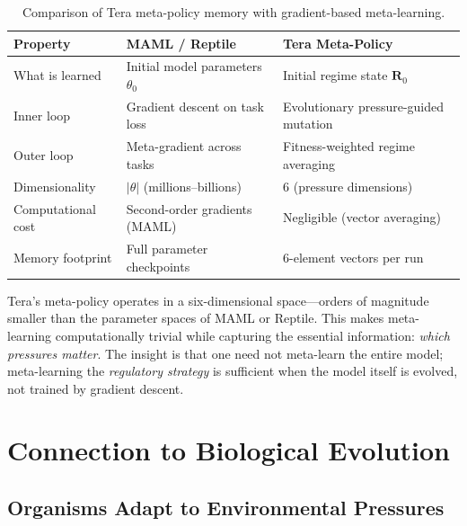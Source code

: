 \begin{table}[H]
\centering
\caption{Comparison of Tera meta-policy memory with gradient-based meta-learning.}
\label{tab:meta-comparison}
\begin{tabularx}{\textwidth}{L{3cm} Y Y}
\toprule
\textbf{Property} & \textbf{MAML / Reptile} & \textbf{Tera Meta-Policy} \\
\midrule
What is learned & Initial model parameters $\theta_0$ & Initial regime state $\mathbf{R}_0$ \\
Inner loop & Gradient descent on task loss & Evolutionary pressure-guided mutation \\
Outer loop & Meta-gradient across tasks & Fitness-weighted regime averaging \\
Dimensionality & $|\theta|$ (millions--billions) & 6 (pressure dimensions) \\
Computational cost & Second-order gradients (MAML) & Negligible (vector averaging) \\
Memory footprint & Full parameter checkpoints & 6-element vectors per run \\
\bottomrule
\end{tabularx}
\end{table}

\begin{keyinsight}
Tera's meta-policy operates in a six-dimensional space---orders of magnitude smaller than the parameter spaces of MAML or Reptile. This makes meta-learning computationally trivial while capturing the essential information: \emph{which pressures matter}. The insight is that one need not meta-learn the entire model; meta-learning the \emph{regulatory strategy} is sufficient when the model itself is evolved, not trained by gradient descent.
\end{keyinsight}

\section{Connection to Biological Evolution}
\label{sec:bio-evolution}

\subsection{Organisms Adapt to Environmental Pressures}

